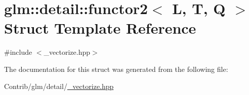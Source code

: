 \hypertarget{structglm_1_1detail_1_1functor2}{}\section{glm\+:\+:detail\+:\+:functor2$<$ L, T, Q $>$ Struct Template Reference}
\label{structglm_1_1detail_1_1functor2}


{\ttfamily \#include $<$\+\_\+vectorize.\+hpp$>$}



The documentation for this struct was generated from the following file\+:\begin{DoxyCompactItemize}
\item 
Contrib/glm/detail/\mbox{\hyperlink{__vectorize_8hpp}{\+\_\+vectorize.\+hpp}}\end{DoxyCompactItemize}
